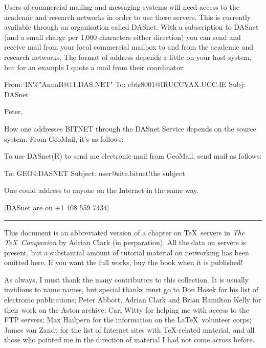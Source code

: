      Users of commercial mailing and messaging systems will need access
     to the academic and research networks in order to use these
     servers. This is currently available through an organisation called
     DASnet. With a subscription to DASnet (and a small charge per
     1,000 characters either direction) you can send and receive mail
     from your local commercial mailbox to and from the academic and
     research networks. The format of address depends a little on your
     host system, but for an example I quote a mail from their
     coordinator:

{\tx From: IN\%"AnnaB@11.DAS.NET"}\nl
{\tx To: cbts8001@IRUCCVAX.UCC.IE }\nl
{\tx Subj: DASnet }

     Peter,

     How one addresses BITNET through the DASnet Service depends on the
     source system.  From GeoMail, it's as follows:

     To use DASnet(R) to send me electronic mail from GeoMail, send mail
     as follows:

{\tx To: GEO4:DASNET }\nl
{\tx Subject: user@site.bitnet!the subject }

     One could address to anyone on the Internet in the same way.

     [DASnet are on +1 408 559 7434]

\bigskip
\hrule%
\bigskip

     This document is an abbreviated version of a chapter on \TeX\
     servers in {\it The \TeX\ Companion} by Adrian Clark (in
     perparation). All the data on servers is present, but a substantial
     amount of tutorial material on networking has been omitted here.
     If you want the full works, buy the book when it is published!

     As always, I must thank the many contributors to this collection.
     It is usually invidious to name names, but special thanks must go
     to Don Hosek for his list of electronic publications; Peter Abbott,
     Adrian Clark and Brian Hamilton Kelly for their work on the Aston
     archive; Carl Witty for helping me with access to the FTP servers;
     Max Hailpern for the information on the \LaTeX\ volunteer corps;
     James van Zandt for the list of Internet sites with \TeX-related
     material, and all those who pointed me in the direction of material
     I had not come across before.
\bye

